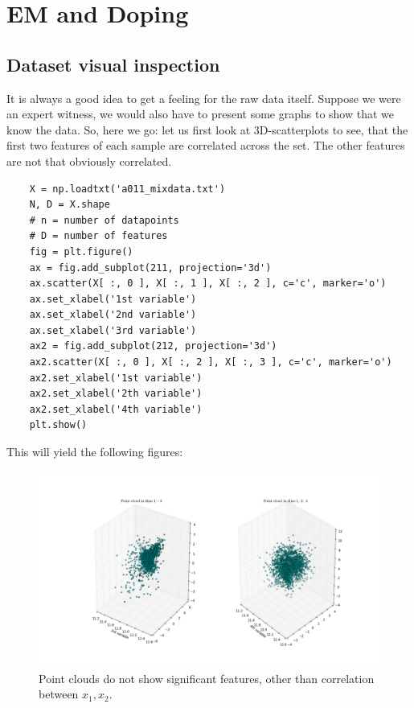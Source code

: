 \section{EM and Doping}
\subsection{Dataset visual inspection}
It is always a good idea to get a feeling for the raw data itself. 
Suppose we were an expert witness, we would also have to present some graphs to show that we know the data.
So, here we go: let us first look at 3D-scatterplots to see, that the first two features of each sample are correlated across the set.
The other features are not that obviously correlated.

\begin{verbatim}
    X = np.loadtxt('a011_mixdata.txt')
    N, D = X.shape
    # n = number of datapoints
    # D = number of features
    fig = plt.figure()
    ax = fig.add_subplot(211, projection='3d')
    ax.scatter(X[ :, 0 ], X[ :, 1 ], X[ :, 2 ], c='c', marker='o')
    ax.set_xlabel('1st variable')
    ax.set_xlabel('2nd variable')
    ax.set_xlabel('3rd variable')
    ax2 = fig.add_subplot(212, projection='3d')
    ax2.scatter(X[ :, 0 ], X[ :, 2 ], X[ :, 3 ], c='c', marker='o')
    ax2.set_xlabel('1st variable')
    ax2.set_xlabel('2th variable')
    ax2.set_xlabel('4th variable')
    plt.show()
\end{verbatim}

This will yield the following figures:
	\begin{figure}[H]
		\centering \includegraphics{../Figures/Ex3_1_scatters.png}
		\caption{Point clouds do not show significant features, other than correlation between $x_1, x_2$.}
		\label{fig:31scatters}
	\end{figure}

